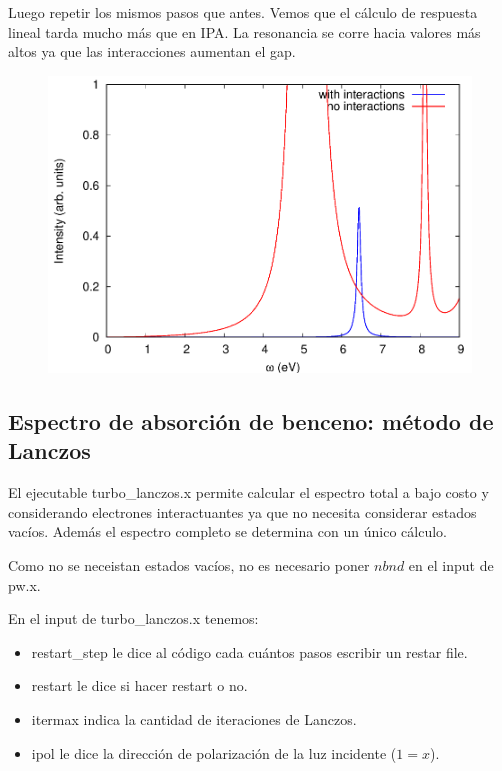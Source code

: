  Luego repetir los mismos pasos que antes. Vemos que el cálculo de respuesta lineal tarda mucho más que en IPA. La resonancia se corre hacia valores más altos ya que las interacciones aumentan el gap.
  \begin{figure}[H]
      \centering
      \includegraphics[scale = 0.4]{figs/D6/Benceno_inter.png}
  \end{figure}

\subsection{Espectro de absorción de benceno: método de Lanczos}

  El ejecutable turbo\_lanczos.x permite calcular el espectro total a bajo costo y considerando electrones interactuantes ya que no necesita considerar estados vacíos. Además el espectro completo se determina con un único cálculo.

  Como no se neceistan estados vacíos, no es necesario poner $nbnd$ en el input de pw.x.


  En el input de turbo\_lanczos.x tenemos:
    \begin{itemize}
      \item restart\_step le dice al código cada cuántos pasos escribir un restar file.
      \item restart le dice si hacer restart o no.
      \item itermax indica la cantidad de iteraciones de Lanczos.
      \item ipol le dice la dirección de polarización de la luz incidente ($1=x$).
    \end{itemize}

